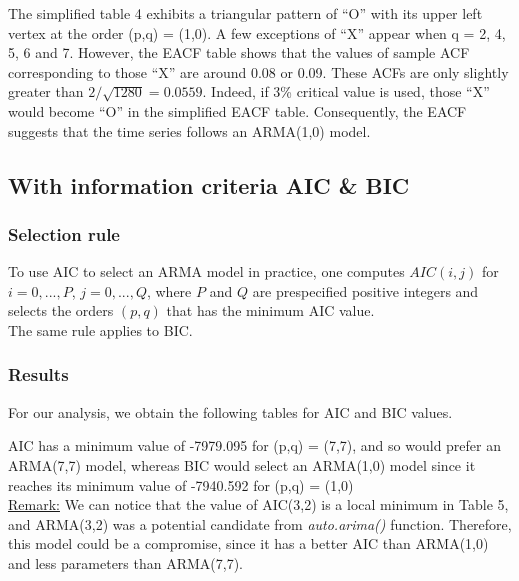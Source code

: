 The simplified  table 4 exhibits  a  triangular  pattern  of  “O”  with  its  upper  left  vertex  at  the  order  (p,q) = (1,0).
A few exceptions of “X” appear when q = 2, 4, 5, 6 and 7.
However, the EACF table  shows  that  the  values  of  sample  ACF  corresponding  to  those  “X”  are  around 0.08 or 0.09.
These ACFs are only slightly greater than $2 / \sqrt{1280} = 0.0559$. Indeed, if 3\% critical value is used, those “X” would become “O” in the simplified EACF table.
Consequently,  the  EACF  suggests  that  the  time series  follows an ARMA(1,0) model.


\subsection{With information criteria AIC \& BIC}

\subsubsection{Selection rule}
To use AIC to select an ARMA model in practice, one computes $AIC(i,j)$ for $i = 0,...,P$, $j = 0,...,Q$, where $P$ and $Q$ are prespecified positive integers and selects the orders $(p,q)$ that has the minimum AIC value.
\\
The same rule applies to BIC.
\\

\subsubsection{Results}
For our analysis, we obtain the following tables for AIC and BIC values.

AIC has a minimum value of -7979.095 for (p,q) = (7,7), and so would prefer an ARMA(7,7) model, whereas BIC would select an ARMA(1,0) model since it reaches its minimum value of -7940.592 for (p,q) = (1,0) \\

\underline{Remark:} We can notice that the value of AIC(3,2) is a local minimum in Table 5, and ARMA(3,2) was a potential candidate from \textit{auto.arima()} function. Therefore, this model could be a compromise, since it has a better AIC than ARMA(1,0) and less parameters than ARMA(7,7). \\

